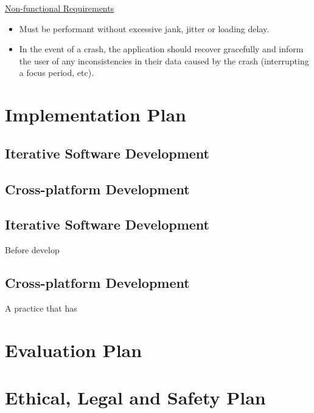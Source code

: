 \underline{Non-functional Requirements}
\begin{itemize}
    \item Must be performant without excessive jank, jitter or loading delay.
    \item In the event of a crash, the application should recover gracefully and inform the user of any inconsistencies in their data caused by the crash (interrupting a focus period, etc).
\end{itemize}


\section{Implementation Plan}
\subsection{Iterative Software Development}

\subsection{Cross-platform Development}

\subsection{Iterative Software Development}
Before develop


\subsection{Cross-platform Development}
A practice that has


\section{Evaluation Plan}


\section{Ethical, Legal and Safety Plan}